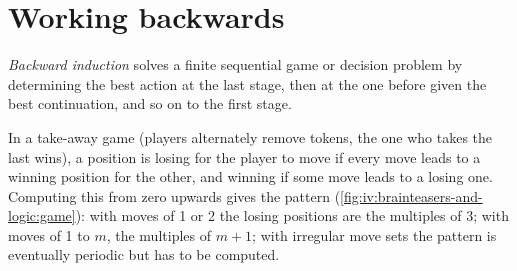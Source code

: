 \section{Working backwards}

\begin{definition}\label{def:iv:brainteasers-and-logic:backward}
\emph{Backward induction} solves a finite sequential game or decision problem by
determining the best action at the last stage, then at the one before given the best continuation, and so on to
the first stage.
\end{definition}

In a take-away game (players alternately remove tokens, the one who takes the last wins), a position is losing
for the player to move if every move leads to a winning position for the other, and winning if some move leads
to a losing one. Computing this from zero upwards gives the pattern (\cref{fig:iv:brainteasers-and-logic:game}):
with moves of 1 or 2 the losing positions are the multiples of 3; with moves of 1 to $m$, the multiples of
$m+1$; with irregular move sets the pattern is eventually periodic but has to be computed.

\begin{omfigure}

\label{fig:iv:brainteasers-and-logic:game}
\end{omfigure}

